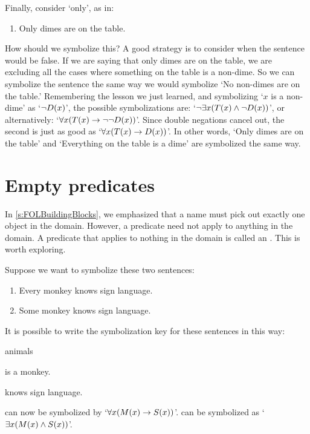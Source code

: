 
Finally, consider `only', as in:
\begin{enumerate}
	\item\label{quan5} Only dimes are on the table.
\end{enumerate}
How should we symbolize this?  A good strategy is to consider when the sentence would be false.  If we are saying that only dimes are on the table, we are excluding all the cases where something on the table is a non-dime.  So we can symbolize the sentence the same way we would symbolize `No non-dimes are on the table.' Remembering the lesson we just learned, and symbolizing `$x$ is a non-dime' as `$\neg D(x)$', the possible symbolizations are: `$\neg\exists x(T(x) \wedge \neg D(x))$', or alternatively: `$\forall x(T(x) \rightarrow \neg\neg D(x))$'. Since double negations cancel out, the second is just as good as `$\forall x(T(x) \rightarrow D(x))$'. In other words, `Only dimes are on the table' and `Everything on the table is a dime' are symbolized the same way.


\section{Empty predicates}

In \cref{s:FOLBuildingBlocks}, we emphasized that a name must pick out exactly one object in the domain. However, a predicate need not apply to anything in the domain. A predicate that applies to nothing in the domain is called an . This is worth exploring.


Suppose we want to symbolize these two sentences:
	\begin{enumerate}
		\item\label{monkey1} Every monkey knows sign language.
		\item\label{monkey2} Some monkey knows sign language.
	\end{enumerate}
It is possible to write the symbolization key for these sentences in this way:
	\begin{ekey}
		\item[\text{domain}] animals
		\item[\atom{M}{x}]  is a monkey.
		\item[\atom{S}{x}]  knows sign language.
	\end{ekey}
 can now be symbolized by `$\forall x(M(x) \rightarrow S(x))$'.  can be symbolized as `$\exists x(M(x) \wedge S(x))$'.

